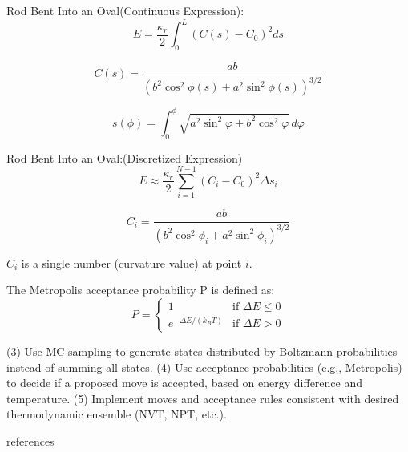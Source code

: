 \documentclass[12pt]{article}
\begin{document}
\begin{flushleft}
Rod Bent Into an Oval(Continuous Expression):
\begin{equation}
E = \frac{\kappa_r}{2} \int_0^L \left( C(s) - C_0 \right)^2 ds
\end{equation}


\begin{equation}
C(s) = \frac{ab}{\left(b^2 \cos^2 \phi(s) + a^2 \sin^2 \phi(s) \right)^{3/2}}
\end{equation}

\begin{equation}
s(\phi) = \int_0^\phi \sqrt{a^2 \sin^2 \varphi + b^2 \cos^2 \varphi} \, d\varphi
\end{equation}



Rod Bent Into an Oval:(Discretized Expression)
\begin{equation}
E \approx \frac{\kappa_r}{2} \sum_{i=1}^{N-1} (C_i - C_0)^2 \Delta s_i
\end{equation}

\begin{equation}
C_i = \frac{a b}{\left( b^2 \cos^2 \phi_i + a^2 \sin^2 \phi_i \right)^{3/2}}
\end{equation}

$C_i$ is a single number (curvature value) at point $i$.

The Metropolis acceptance probability P is defined as:
\begin{equation}
P = \begin{cases}
1 & \text{if } \Delta E \leq 0 \\
e^{-\Delta E / (k_B T)} & \text{if } \Delta E > 0
\end{cases}
\end{equation}

\newpage



(3)  Use MC sampling to generate states distributed by Boltzmann probabilities instead of summing all states.
(4)	Use acceptance probabilities (e.g., Metropolis) to decide if a proposed move is accepted, based on energy difference and temperature.
(5)	Implement moves and acceptance rules consistent with desired thermodynamic ensemble (NVT, NPT, etc.).



\end{flushleft}

 {references}  
\end{document}
